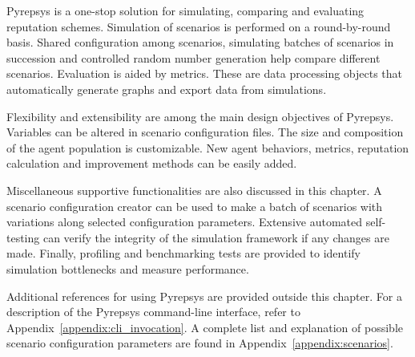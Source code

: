 \documentclass[%
    ]{\PathToTumTemplate/thesis/tum_thesis}
\begin{document}
Pyrepsys is a one-stop solution for simulating, comparing and evaluating reputation schemes.
Simulation of scenarios is performed on a round-by-round basis.
Shared configuration among scenarios, simulating batches of scenarios in succession and controlled random number generation help compare different scenarios.
Evaluation is aided by metrics.
These are data processing objects that automatically generate graphs and export data from simulations.

Flexibility and extensibility are among the main design objectives of Pyrepsys.
Variables can be altered in scenario configuration files.
The size and composition of the agent population is customizable.
New agent behaviors, metrics, reputation calculation and improvement methods can be easily added.

Miscellaneous supportive functionalities are also discussed in this chapter.
A scenario configuration creator can be used to make a batch of scenarios with variations along selected configuration parameters.
Extensive automated self-testing can verify the integrity of the simulation framework if any changes are made.
Finally, profiling and benchmarking tests are provided to identify simulation bottlenecks and measure performance.

Additional references for using Pyrepsys are provided outside this chapter.
For a description of the Pyrepsys command-line interface, refer to Appendix~\ref{appendix:cli_invocation}.
A complete list and explanation of possible scenario configuration parameters are found in Appendix~\ref{appendix:scenarios}.

\end{document}
